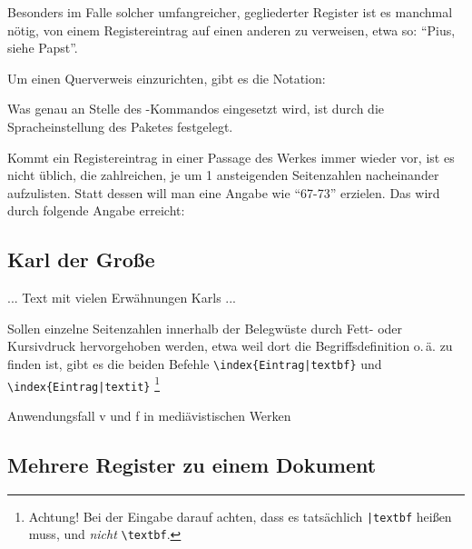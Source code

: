 
Besonders im Falle solcher umfangreicher, gegliederter Register ist es manchmal nötig,
von einem Registereintrag auf einen anderen zu verweisen, etwa so: \enquote{Pius, siehe Papst}.

Um einen Querverweis einzurichten, gibt es die Notation:

\begin{lfgwcode}{}
\end{lfgwcode}

Was genau an Stelle des -Kommandos eingesetzt wird, ist durch die Spracheinstellung des 
Paketes  festgelegt.


Kommt ein Registereintrag in einer Passage des Werkes immer wieder vor, ist es nicht üblich, die
zahlreichen, je um 1 ansteigenden Seitenzahlen nacheinander aufzulisten. Statt dessen will man
eine Angabe wie \enquote{67-73} erzielen. Das wird durch folgende Angabe erreicht:

\begin{lfgwcode}{}
    \chapter{Karl der Große}
    ... Text mit vielen Erwähnungen Karls ...
\end{lfgwcode}


Sollen einzelne Seitenzahlen innerhalb der Belegwüste durch Fett- oder Kursivdruck hervorgehoben
werden, etwa weil dort die Begriffsdefinition o.\,ä. zu finden ist, gibt es die beiden Befehle
\lstinline/\index{Eintrag|textbf}/ und 
\lstinline/\index{Eintrag|textit}/%
\footnote{Achtung! Bei der Eingabe darauf achten, dass es tatsächlich 
    \lstinline/|textbf/ heißen muss, und \emph{nicht} 
    \lstinline/\textbf/.}




Anwendungsfall v und f in mediävistischen Werken



\section{Mehrere Register zu einem Dokument}

